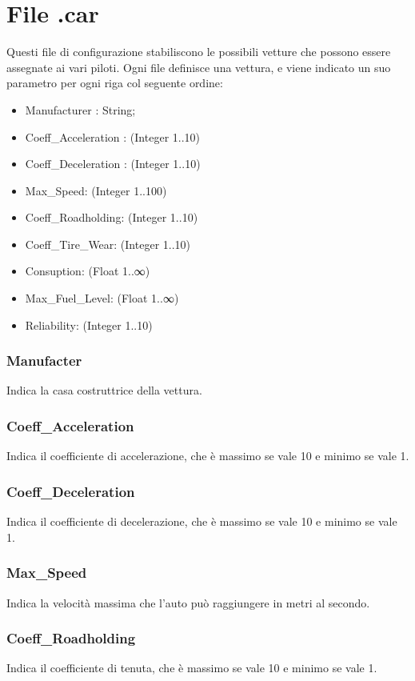 \documentclass[a4paper,11pt, twoside]{book}
\begin{document}
      \section{File .car}
	Questi file di configurazione stabiliscono le possibili vetture che possono essere assegnate ai vari piloti.
	Ogni file definisce una vettura, e viene indicato un suo parametro per ogni riga col seguente ordine:
	
	\begin{itemize}
	  \item Manufacturer : String;
	  \item Coeff\_Acceleration : (Integer 1..10)
	  \item Coeff\_Deceleration : (Integer 1..10)
	  \item Max\_Speed: (Integer 1..100)
	  \item Coeff\_Roadholding: (Integer 1..10)
	  \item Coeff\_Tire\_Wear: (Integer 1..10)
	  \item Consuption: (Float 1..∞)
	  \item Max\_Fuel\_Level: (Float 1..∞)
	  \item Reliability: (Integer 1..10)
	\end{itemize}
	
	\subsubsection{Manufacter}
	  Indica la casa costruttrice della vettura.

	\subsubsection{Coeff\_Acceleration}
	  Indica il coefficiente di accelerazione, che è massimo se vale 10 e minimo se vale 1.

	\subsubsection{Coeff\_Deceleration}
	Indica il coefficiente di decelerazione, che è massimo se vale 10 e minimo se vale 1.

	\subsubsection{Max\_Speed}
	  Indica la velocità massima che l'auto può raggiungere in metri al secondo.

	\subsubsection{Coeff\_Roadholding}
	  Indica il coefficiente di tenuta, che è massimo se vale 10 e minimo se vale 1.
\end{document}
